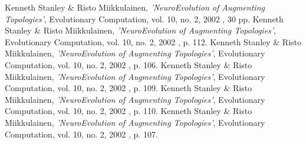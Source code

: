 \documentclass[]{Learning-to-Play-Wolfenstein-thesis}
\begin{document}
\newpage
\begin{thebibliography}{99}
 Kenneth Stanley \& Risto Miikkulainen, \emph{'NeuroEvolution of Augmenting Topologies'}, Evolutionary Computation, vol. 10, no. 2, 2002 , 30 pp.
 Kenneth Stanley \& Risto Miikkulainen, \emph{'NeuroEvolution of Augmenting Topologies'}, Evolutionary Computation, vol. 10, no. 2, 2002 , p. 112.
Kenneth Stanley \& Risto Miikkulainen, \emph{'NeuroEvolution of Augmenting Topologies'}, Evolutionary Computation, vol. 10, no. 2, 2002 , p. 106.
 Kenneth Stanley \& Risto Miikkulainen, \emph{'NeuroEvolution of Augmenting Topologies'}, Evolutionary Computation, vol. 10, no. 2, 2002 , p. 109.
 Kenneth Stanley \& Risto Miikkulainen, \emph{'NeuroEvolution of Augmenting Topologies'}, Evolutionary Computation, vol. 10, no. 2, 2002 , p. 110.
 Kenneth Stanley \& Risto Miikkulainen, \emph{'NeuroEvolution of Augmenting Topologies'}, Evolutionary Computation, vol. 10, no. 2, 2002 , p. 107.
\end{thebibliography}
\label{endpage}
\end{document}
